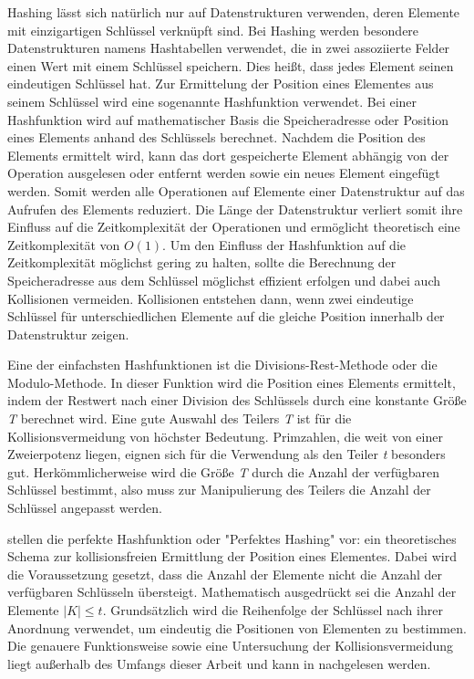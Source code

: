 Hashing lässt sich natürlich nur auf Datenstrukturen verwenden, deren Elemente mit einzigartigen Schlüssel verknüpft sind. Bei Hashing werden besondere Datenstrukturen namens Hashtabellen verwendet, die in zwei assoziierte Felder einen Wert mit einem Schlüssel speichern. Dies heißt, dass jedes Element seinen eindeutigen Schlüssel hat. Zur Ermittelung der Position eines Elementes aus seinem Schlüssel wird eine sogenannte Hashfunktion verwendet. Bei einer Hashfunktion wird auf mathematischer Basis die Speicheradresse oder Position eines Elements anhand des Schlüssels berechnet. Nachdem die Position des Elements ermittelt wird, kann das dort gespeicherte Element abhängig von der Operation ausgelesen oder entfernt werden sowie ein neues Element eingefügt werden. Somit werden alle Operationen auf Elemente einer Datenstruktur auf das Aufrufen des Elements reduziert. Die Länge der Datenstruktur verliert somit ihre Einfluss auf die Zeitkomplexität der Operationen und ermöglicht theoretisch eine Zeitkomplexität von $O(1)$. Um den Einfluss der Hashfunktion auf die Zeitkomplexität möglichst gering zu halten, sollte die Berechnung der Speicheradresse aus dem Schlüssel möglichst effizient erfolgen und dabei auch Kollisionen vermeiden. Kollisionen entstehen dann, wenn zwei eindeutige Schlüssel für unterschiedlichen Elemente auf die gleiche Position innerhalb der Datenstruktur zeigen. \autocite[230-231]{hubwieser_fundamente_2015}

Eine der einfachsten Hashfunktionen ist die Divisions-Rest-Methode oder die Modulo-Methode. In dieser Funktion wird die Position eines Elements ermittelt, indem der Restwert nach einer Division des Schlüssels durch eine konstante Größe \textit{T} berechnet wird. Eine gute Auswahl des Teilers \textit{T} ist für die Kollisionsvermeidung von höchster Bedeutung. Primzahlen, die weit von einer Zweierpotenz liegen, eignen sich für die Verwendung als den Teiler \textit{t} besonders gut. Herkömmlicherweise wird die Größe \textit{T} durch die Anzahl der verfügbaren Schlüssel bestimmt, also muss zur Manipulierung des Teilers die Anzahl der Schlüssel angepasst werden. \autocite[230-231]{hubwieser_fundamente_2015}

\Textcite[232]{hubwieser_fundamente_2015} stellen die perfekte Hashfunktion oder "Perfektes Hashing" vor: ein theoretisches Schema zur kollisionsfreien Ermittlung der Position eines Elementes. Dabei wird die Voraussetzung gesetzt, dass die Anzahl der Elemente nicht die Anzahl der verfügbaren Schlüsseln übersteigt. Mathematisch ausgedrückt sei die Anzahl der Elemente $|K| \leq t$. Grundsätzlich wird die Reihenfolge der Schlüssel nach ihrer Anordnung verwendet, um eindeutig die Positionen von Elementen zu bestimmen. Die genauere Funktionsweise sowie eine Untersuchung der Kollisionsvermeidung liegt außerhalb des Umfangs dieser Arbeit und kann in \textcite[92-94]{mehlhorn_algorithms_2008} nachgelesen werden.

